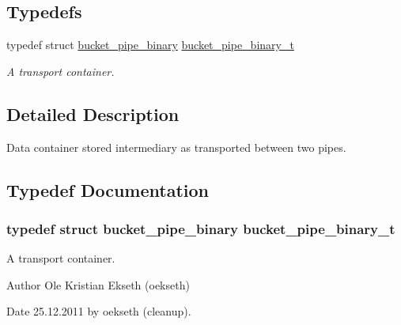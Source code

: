 \subsection*{Typedefs}
\begin{DoxyCompactItemize}
\item 
typedef struct \hyperlink{structbucket__pipe__binary}{bucket\_\-pipe\_\-binary} \hyperlink{group__filter__transport__container_ga843887e3c0e4c676c4c8e7d338573e47}{bucket\_\-pipe\_\-binary\_\-t}
\begin{DoxyCompactList}\small\item\em A transport container. \end{DoxyCompactList}\end{DoxyCompactItemize}


\subsection{Detailed Description}
Data container stored intermediary as transported between two pipes. 

\subsection{Typedef Documentation}
\hypertarget{group__filter__transport__container_ga843887e3c0e4c676c4c8e7d338573e47}{
\subsubsection[{bucket\_\-pipe\_\-binary\_\-t}]{\setlength{\rightskip}{0pt plus 5cm}typedef struct {\bf bucket\_\-pipe\_\-binary} {\bf bucket\_\-pipe\_\-binary\_\-t}}}
\label{group__filter__transport__container_ga843887e3c0e4c676c4c8e7d338573e47}


A transport container. 

\begin{DoxyAuthor}{Author}
Ole Kristian Ekseth (oekseth) 
\end{DoxyAuthor}
\begin{DoxyDate}{Date}
25.12.2011 by oekseth (cleanup). 
\end{DoxyDate}
